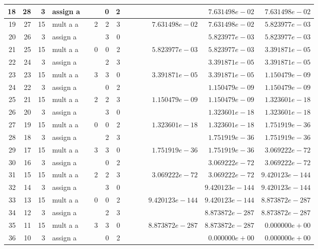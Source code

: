 \documentclass{article}
\begin{document}
\begin{tabular}{|r|r|r|l|r|r|r|r||r|r||r|r|r|r|}
18 & 28 & 3 & assign a & & & 0 & 2 & & & & &$ 7.631498e-02 $&$ 7.631498e-02 $\\ \hline 
19 & 27 & 15 & mult a a & & 2 & 2 & 3 & & & &$ 7.631498e-02 $&$ 7.631498e-02 $&$ 5.823977e-03 $\\ \hline 
20 & 26 & 3 & assign a & & & 3 & 0 & & & & &$ 5.823977e-03 $&$ 5.823977e-03 $\\ \hline 
21 & 25 & 15 & mult a a & & 0 & 0 & 2 & & & &$ 5.823977e-03 $&$ 5.823977e-03 $&$ 3.391871e-05 $\\ \hline 
22 & 24 & 3 & assign a & & & 2 & 3 & & & & &$ 3.391871e-05 $&$ 3.391871e-05 $\\ \hline 
23 & 23 & 15 & mult a a & & 3 & 3 & 0 & & & &$ 3.391871e-05 $&$ 3.391871e-05 $&$ 1.150479e-09 $\\ \hline 
24 & 22 & 3 & assign a & & & 0 & 2 & & & & &$ 1.150479e-09 $&$ 1.150479e-09 $\\ \hline 
25 & 21 & 15 & mult a a & & 2 & 2 & 3 & & & &$ 1.150479e-09 $&$ 1.150479e-09 $&$ 1.323601e-18 $\\ \hline 
26 & 20 & 3 & assign a & & & 3 & 0 & & & & &$ 1.323601e-18 $&$ 1.323601e-18 $\\ \hline 
27 & 19 & 15 & mult a a & & 0 & 0 & 2 & & & &$ 1.323601e-18 $&$ 1.323601e-18 $&$ 1.751919e-36 $\\ \hline 
28 & 18 & 3 & assign a & & & 2 & 3 & & & & &$ 1.751919e-36 $&$ 1.751919e-36 $\\ \hline 
29 & 17 & 15 & mult a a & & 3 & 3 & 0 & & & &$ 1.751919e-36 $&$ 1.751919e-36 $&$ 3.069222e-72 $\\ \hline 
30 & 16 & 3 & assign a & & & 0 & 2 & & & & &$ 3.069222e-72 $&$ 3.069222e-72 $\\ \hline 
31 & 15 & 15 & mult a a & & 2 & 2 & 3 & & & &$ 3.069222e-72 $&$ 3.069222e-72 $&$ 9.420123e-144 $\\ \hline 
32 & 14 & 3 & assign a & & & 3 & 0 & & & & &$ 9.420123e-144 $&$ 9.420123e-144 $\\ \hline 
33 & 13 & 15 & mult a a & & 0 & 0 & 2 & & & &$ 9.420123e-144 $&$ 9.420123e-144 $&$ 8.873872e-287 $\\ \hline 
34 & 12 & 3 & assign a & & & 2 & 3 & & & & &$ 8.873872e-287 $&$ 8.873872e-287 $\\ \hline 
35 & 11 & 15 & mult a a & & 3 & 3 & 0 & & & &$ 8.873872e-287 $&$ 8.873872e-287 $&$ 0.000000e+00 $\\ \hline 
36 & 10 & 3 & assign a & & & 0 & 2 & & & & &$ 0.000000e+00 $&$ 0.000000e+00 $\\ \hline 

\end{tabular}
\end{document}
